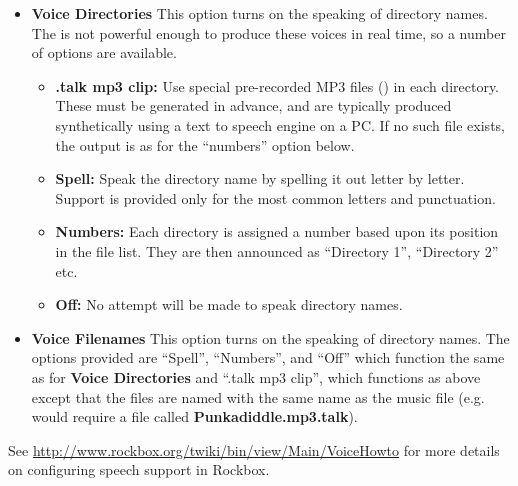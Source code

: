 \begin{itemize}
\begin{itemize}
  \item \textbf{Voice Directories}
    This option turns on the speaking of directory names.  The \dap is not powerful enough to produce these voices in real time, so a number of options are available.
    \begin{itemize}
    \item \textbf{.talk mp3 clip: }
      Use special pre{}-recorded MP3 files () in each directory.  These must be generated in advance, and are typically produced synthetically using a text to speech engine on a PC.  If no such file exists, the output is as for the ``numbers'' option below.
    \item \textbf{Spell: }
      Speak the directory name by spelling it out letter by letter.  Support is provided only for the most common letters and punctuation.
    \item \textbf{Numbers: }
      Each directory is assigned a number based upon its position in the file list.  They are then announced as ``Directory 1'', ``Directory 2'' etc.
    \item \textbf{Off: }
      No attempt will be made to speak directory names.
    \end{itemize}
    
  \item \textbf{Voice Filenames}
    This option turns on the speaking of directory names.  The options provided are ``Spell'', ``Numbers'', and ``Off'' which function the same as for \textbf{Voice Directories} and ``.talk mp3 clip'', which functions as above except that the files are named with the same name as the music file (e.g.  would require a file called \textbf{Punkadiddle.mp3.talk}).
  \end{itemize}
\end{itemize}
See \url{http://www.rockbox.org/twiki/bin/view/Main/VoiceHowto} for more details on configuring speech support in Rockbox.

